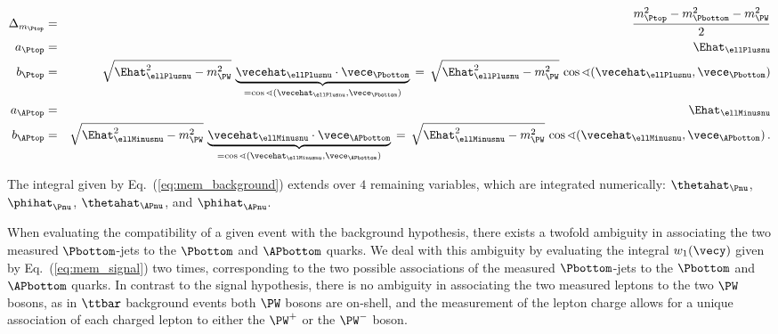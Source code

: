 \begin{linenowrapper}
\begin{eqnarray}
\Delta_{m_{\Ptop}} & = & \frac{m_{\Ptop}^{2} - m_{\Pbottom}^{2} - m_{\PW}^{2}}{2} \nonumber \\
a_{\Ptop} & = & \Ehat_{\ellPlusnu} \nonumber \\
b_{\Ptop} & = & \sqrt{\Ehat_{\ellPlusnu}^{2} - m_{\PW}^{2}} \, 
 \underbrace{\vecehat_{\ellPlusnu} \cdot \vece_{\Pbottom}}_{= \cos\sphericalangle(\vecehat_{\ellPlusnu},\vece_{\Pbottom})} \, 
= \, \sqrt{\Ehat_{\ellPlusnu}^{2} - m_{\PW}^{2}} \, \cos\sphericalangle(\vecehat_{\ellPlusnu},\vece_{\Pbottom}) \nonumber \\
a_{\APtop} & = & \Ehat_{\ellMinusnu} \nonumber \\
b_{\APtop} & = & \sqrt{\Ehat_{\ellMinusnu}^{2} - m_{\PW}^{2}} \, 
 \underbrace{\vecehat_{\ellMinusnu} \cdot \vece_{\APbottom}}_{= \cos\sphericalangle(\vecehat_{\ellMinusnu},\vece_{\APbottom})} \,
= \, \sqrt{\Ehat_{\ellMinusnu}^{2} - m_{\PW}^{2}} \, \cos\sphericalangle(\vecehat_{\ellMinusnu},\vece_{\APbottom}) \, .
\end{eqnarray}
\end{linenowrapper}
The integral given by Eq.~(\ref{eq:mem_background}) extends over $4$ remaining variables,
which are integrated numerically: $\thetahat_{\Pnu}$, $\phihat_{\Pnu}$, $\thetahat_{\APnu}$, and $\phihat_{\APnu}$.

When evaluating the compatibility of a given event with the background hypothesis,
there exists a twofold ambiguity in associating the two measured $\Pbottom$-jets to the $\Pbottom$ and $\APbottom$ quarks.
We deal with this ambiguity by evaluating the integral $w_{1}(\vecy)$ given by Eq.~(\ref{eq:mem_signal}) two times,
corresponding to the two possible associations of the measured $\Pbottom$-jets to the $\Pbottom$ and $\APbottom$ quarks.
In contrast to the signal hypothesis,
there is no ambiguity in associating the two measured leptons to the two $\PW$ bosons,
as in $\ttbar$ background events both $\PW$ bosons are on-shell,
and the measurement of the lepton charge allows for a unique association of each charged lepton to either the $\PW^{+}$ or the $\PW^{-}$ boson.

